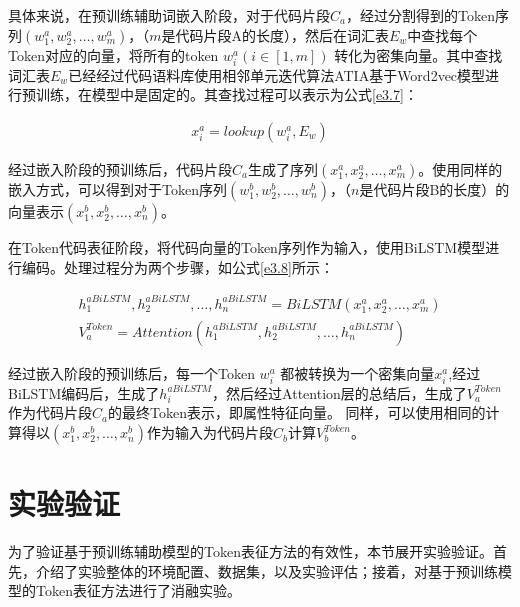 具体来说，在预训练辅助词嵌入阶段，对于代码片段$C_{a}$，经过分割得到的Token序列$\left( w_{1}^{a},w_{2}^{a},\ldots,w_{m}^{a}\right)$，（$m$是代码片段A的长度），然后在词汇表$E_{w}$中查找每个Token对应的向量，将所有的token $w_{i}^{a} \left(i \in [1,m]\right)$ 转化为密集向量。其中查找词汇表$E_{w}$已经经过代码语料库使用相邻单元迭代算法ATIA基于Word2vec模型进行预训练，在模型中是固定的。其查找过程可以表示为公式\ref{e3.7}：

\begin{equation}\label{e3.7}
  \begin{split}
  x_{i}^{a} = lookup \left(w_{i}^{a} ,E_{w} \right)
  \end{split}
\end{equation}

经过嵌入阶段的预训练后，代码片段$C_{a}$生成了序列$\left( x_{1}^{a},x_{2}^{a},\ldots,x_{m}^{a}\right)$。使用同样的嵌入方式，可以得到对于Token序列$\left( w_{1}^{b},w_{2}^{b},\ldots,w_{n}^{b}\right)$，（$n$是代码片段B的长度）的向量表示$\left( x_{1}^{b},x_{2}^{b},\ldots,x_{n}^{b} \right)$。

在Token代码表征阶段，将代码向量的Token序列作为输入，使用BiLSTM模型进行编码。处理过程分为两个步骤，如公式\ref{e3.8}所示：

\begin{equation}\label{e3.8}
  \begin{split}
    h_{1}^{aBiLSTM},h_{2}^{aBiLSTM},\ldots,h_{n}^{aBiLSTM} = BiLSTM \left(x_{1}^{a},x_{2}^{a},\ldots,x_{m}^{a}\right) \\
    V_{a}^{Token} = Attention \left( h_{1}^{aBiLSTM},h_{2}^{aBiLSTM},\ldots,h_{n}^{aBiLSTM} \right)
  \end{split}
\end{equation}

经过嵌入阶段的预训练后，每一个Token $w_{i}^{a}$ 都被转换为一个密集向量$x_{i}^{a}$,经过BiLSTM编码后，生成了$h_{i}^{aBiLSTM}$，然后经过Attention层的总结后，生成了$V_{a}^{Token}$作为代码片段$C_{a}$的最终Token表示，即属性特征向量。
同样，可以使用相同的计算得以$\left( x_{1}^{b},x_{2}^{b},\ldots,x_{n}^{b} \right)$作为输入为代码片段$C_{b}$计算$V_{b}^{Token}$。

\section{实验验证}
\label{sec:Experiment}
为了验证基于预训练辅助模型的Token表征方法的有效性，本节展开实验验证。首先，介绍了实验整体的环境配置、数据集，以及实验评估；接着，对基于预训练模型的Token表征方法进行了消融实验。

